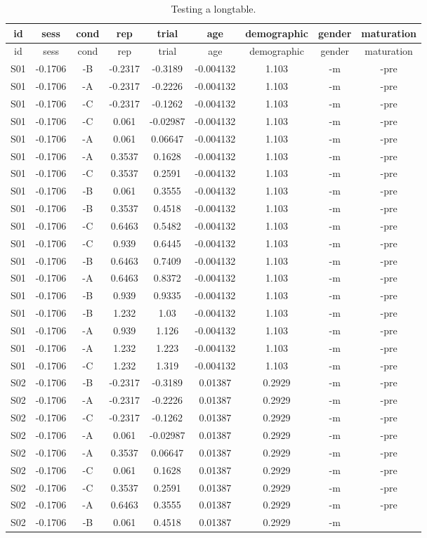 \documentclass[\pandocDocMode,longtable,noextraspace,floatsintext]{apa6}
\begin{document}
\begin{longtable}[]{@{}ccccccccc@{}}
\caption{Testing a longtable. \label{tbl:tbllong}}\tabularnewline
\toprule
id & sess & cond & rep & trial & age & demographic & gender &
maturation\tabularnewline
\midrule
\endfirsthead
\toprule
id & sess & cond & rep & trial & age & demographic & gender &
maturation\tabularnewline
\midrule
\endhead
S01 & -0.1706 & -B & -0.2317 & -0.3189 & -0.004132 & 1.103 & -m &
-pre\tabularnewline
S01 & -0.1706 & -A & -0.2317 & -0.2226 & -0.004132 & 1.103 & -m &
-pre\tabularnewline
S01 & -0.1706 & -C & -0.2317 & -0.1262 & -0.004132 & 1.103 & -m &
-pre\tabularnewline
S01 & -0.1706 & -C & 0.061 & -0.02987 & -0.004132 & 1.103 & -m &
-pre\tabularnewline
S01 & -0.1706 & -A & 0.061 & 0.06647 & -0.004132 & 1.103 & -m &
-pre\tabularnewline
S01 & -0.1706 & -A & 0.3537 & 0.1628 & -0.004132 & 1.103 & -m &
-pre\tabularnewline
S01 & -0.1706 & -C & 0.3537 & 0.2591 & -0.004132 & 1.103 & -m &
-pre\tabularnewline
S01 & -0.1706 & -B & 0.061 & 0.3555 & -0.004132 & 1.103 & -m &
-pre\tabularnewline
S01 & -0.1706 & -B & 0.3537 & 0.4518 & -0.004132 & 1.103 & -m &
-pre\tabularnewline
S01 & -0.1706 & -C & 0.6463 & 0.5482 & -0.004132 & 1.103 & -m &
-pre\tabularnewline
S01 & -0.1706 & -C & 0.939 & 0.6445 & -0.004132 & 1.103 & -m &
-pre\tabularnewline
S01 & -0.1706 & -B & 0.6463 & 0.7409 & -0.004132 & 1.103 & -m &
-pre\tabularnewline
S01 & -0.1706 & -A & 0.6463 & 0.8372 & -0.004132 & 1.103 & -m &
-pre\tabularnewline
S01 & -0.1706 & -B & 0.939 & 0.9335 & -0.004132 & 1.103 & -m &
-pre\tabularnewline
S01 & -0.1706 & -B & 1.232 & 1.03 & -0.004132 & 1.103 & -m &
-pre\tabularnewline
S01 & -0.1706 & -A & 0.939 & 1.126 & -0.004132 & 1.103 & -m &
-pre\tabularnewline
S01 & -0.1706 & -A & 1.232 & 1.223 & -0.004132 & 1.103 & -m &
-pre\tabularnewline
S01 & -0.1706 & -C & 1.232 & 1.319 & -0.004132 & 1.103 & -m &
-pre\tabularnewline
S02 & -0.1706 & -B & -0.2317 & -0.3189 & 0.01387 & 0.2929 & -m &
-pre\tabularnewline
S02 & -0.1706 & -A & -0.2317 & -0.2226 & 0.01387 & 0.2929 & -m &
-pre\tabularnewline
S02 & -0.1706 & -C & -0.2317 & -0.1262 & 0.01387 & 0.2929 & -m &
-pre\tabularnewline
S02 & -0.1706 & -A & 0.061 & -0.02987 & 0.01387 & 0.2929 & -m &
-pre\tabularnewline
S02 & -0.1706 & -A & 0.3537 & 0.06647 & 0.01387 & 0.2929 & -m &
-pre\tabularnewline
S02 & -0.1706 & -C & 0.061 & 0.1628 & 0.01387 & 0.2929 & -m &
-pre\tabularnewline
S02 & -0.1706 & -C & 0.3537 & 0.2591 & 0.01387 & 0.2929 & -m &
-pre\tabularnewline
S02 & -0.1706 & -A & 0.6463 & 0.3555 & 0.01387 & 0.2929 & -m &
-pre\tabularnewline
S02 & -0.1706 & -B & 0.061 & 0.4518 & 0.01387 & 0.2929 & -m &

\end{longtable}
\end{document}
